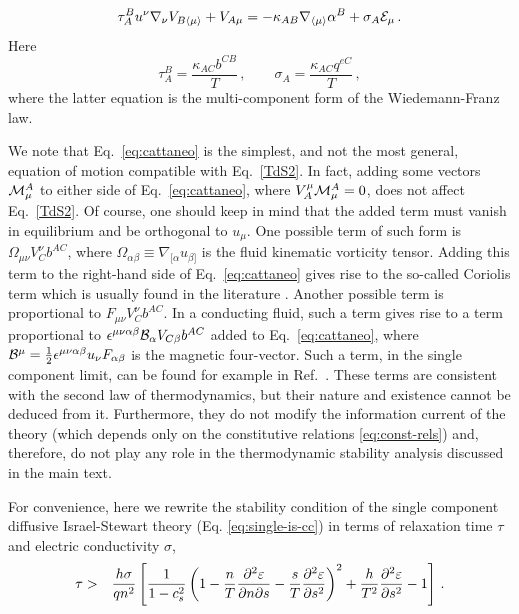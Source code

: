 \documentclass[
a4paper,
amsfonts,
amsmath,
reprint,
showkeys,
nofootinbib,
twoside,
onecolumn,
notitlepage
]{revtex4-1}
\begin{document}
	\begin{equation}\label{eq:cattaneo}
		\tau^B_A u^\nu \nabla_\nu V_{B\langle \mu \rangle} + V_{A\mu} = -\kappa_{AB}\nabla_{\langle\mu \rangle} \alpha^B + \sigma_A {\mathcal{E}}_\mu\,.
	\end{equation}
	Here
	\begin{equation}
		\tau_A^B = \dfrac{\kappa_{AC} b^{CB}}{T} \, , \quad \quad \sigma_A = \dfrac{\kappa_{AC}q^{eC}}{T} \,,
	\end{equation}
	where the latter equation is the multi-component form of the Wiedemann-Franz law.
	
	We note that Eq.\ \eqref{eq:cattaneo} is the simplest, and not the most general, equation of motion compatible with Eq.\ \eqref{TdS2}. In fact, adding some vectors ${\mathcal{M}}^A_\mu$ to either side of Eq.\ \eqref{eq:cattaneo}, where $ V_A^\mu {\mathcal{M}}^A_\mu  = 0$, does not affect Eq.\ \eqref{TdS2}. 
	Of course, one should keep in mind that the added term must vanish in equilibrium and be orthogonal to $u_\mu$.
	One possible term of such form is $\Omega_{\mu\nu}V_{C}^\nu b^{AC}$, where $\Omega_{\alpha \beta} \equiv \nabla_{[\alpha} u_{\beta]}$ is the fluid kinematic vorticity tensor. Adding this term to the right-hand side of Eq.\ \eqref{eq:cattaneo} gives rise to the so-called Coriolis term which is usually found in the literature \cite{Fotakis:2022usk}. Another possible term is proportional to $F_{\mu\nu}V_{C}^\nu b^{AC}$. 
	In a conducting fluid, such a term gives rise to a term proportional to $\epsilon^{\mu\nu\alpha\beta}{\mathcal{B}}_\alpha V_{C\beta}b^{AC}$ added to Eq.\ \eqref{eq:cattaneo}, where ${\mathcal{B}}^\mu = \tfrac{1}{2}\epsilon^{\mu\nu\alpha\beta}u_\nu F_{\alpha\beta}$ is the magnetic four-vector. Such a term, in the single component limit, can be found for example in Ref.\ \cite{Denicol:2019iyh}. 
	These terms are consistent with the second law of thermodynamics, but their nature and existence cannot be deduced from it.
	Furthermore, they do not modify the information current of the theory (which depends only on the constitutive relations \eqref{eq:const-rels}) and, therefore, do not play any role in the thermodynamic stability analysis discussed in the main text.
	
	For convenience, here we rewrite the stability condition of the single component diffusive Israel-Stewart theory (Eq. \eqref{eq:single-is-cc}) in terms of relaxation time $\tau$ and electric conductivity $\sigma$,
	\begin{eqnarray}
		{\tau} &>&  \frac{h\sigma}{q n^2}\left[\frac{1}{1-c_s^2}\left(1-\dfrac{n}{T}\pdv[2]{\varepsilon}{n}{s}-\dfrac{s}{T}\pdv[2]{\varepsilon}{s} \right)^2 + \dfrac{h}{T^2} \pdv[2]{\varepsilon}{s} - 1\right] \,.
	\end{eqnarray}
	
\end{document}
